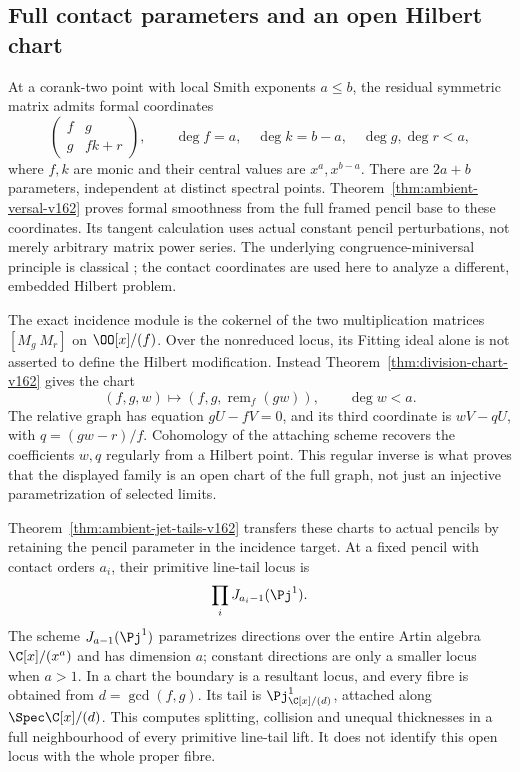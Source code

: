 \subsection{Full contact parameters and an open Hilbert chart}
At a corank-two point with local Smith exponents $a\leq b$, the
residual symmetric matrix admits formal coordinates
\[
 \begin{pmatrix}f&g\\g&fk+r\end{pmatrix},\qquad
 \deg f=a,\quad\deg k=b-a,\quad\deg g,\deg r<a,
\]
where $f,k$ are monic and their central values are $x^a,x^{b-a}$.
There are $2a+b$ parameters, independent at distinct spectral points.
Theorem~\ref{thm:ambient-versal-v162} proves formal smoothness from
the full framed pencil base to these coordinates. Its tangent
calculation uses actual constant pencil perturbations, not merely
arbitrary matrix power series. The underlying congruence-miniversal
principle is classical \cite{Dmytryshyn162}; the contact coordinates
are used here to analyze a different, embedded Hilbert problem.

The exact incidence module is the cokernel of the two multiplication
matrices $[M_g\ M_r]$ on $\OO[x]/(f)$. Over the nonreduced locus,
its Fitting ideal alone is not asserted to define the Hilbert
modification. Instead Theorem~\ref{thm:division-chart-v162} gives
the chart
\[
 (f,g,w)\longmapsto(f,g,\operatorname{rem}_f(gw)),
                        \qquad\deg w<a.
\]
The relative graph has equation $gU-fV=0$, and its third coordinate
is $wV-qU$, with $q=(gw-r)/f$. Cohomology of the attaching scheme
recovers the coefficients $w,q$ regularly from a Hilbert point.
This regular inverse is what proves that the displayed family is
an open chart of the full graph, not just an injective parametrization
of selected limits.

Theorem~\ref{thm:ambient-jet-tails-v162} transfers these charts to
actual pencils by retaining the pencil parameter in the incidence
target. At a fixed pencil with contact orders $a_i$, their primitive
line-tail locus is
\[
                    \prod_iJ_{a_i-1}(\Pj^1).
\]
The scheme $J_{a-1}(\Pj^1)$ parametrizes directions over the entire
Artin algebra $\C[x]/(x^a)$ and has dimension $a$; constant directions
are only a smaller locus when $a>1$. In a chart the boundary is a
resultant locus, and every fibre is obtained from
$d=\gcd(f,g)$. Its tail is $\Pj^1_{\C[x]/(d)}$, attached along
$\Spec\C[x]/(d)$. This computes splitting, collision and unequal
thicknesses in a full neighbourhood of every primitive line-tail
lift. It does not identify this open locus with the whole proper fibre.

